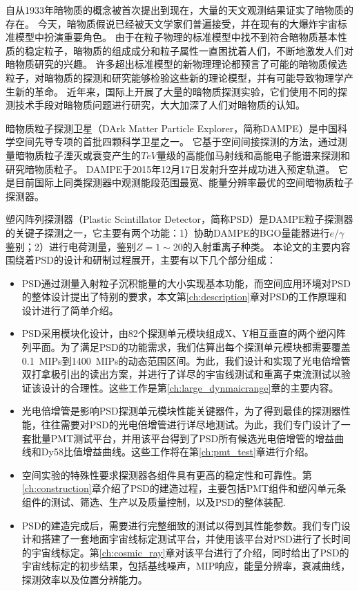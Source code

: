 
\begin{cabstract}
自从1933年暗物质的概念被首次提出到现在，大量的天文观测结果证实了暗物质的存在。
今天，暗物质假说已经被天文学家们普遍接受，并在现有的大爆炸宇宙标准模型中扮演重要角色。
由于在粒子物理的标准模型中找不到符合暗物质基本性质的稳定粒子，暗物质的组成成分和粒子属性一直困扰着人们，不断地激发人们对暗物质研究的兴趣。
许多超出标准模型的新物理理论都预言了可能的暗物质候选粒子，对暗物质的探测和研究能够检验这些新的理论模型，并有可能导致物理学产生新的革命。
近年来，国际上开展了大量的暗物质探测实验，它们使用不同的探测技术手段对暗物质问题进行研究，大大加深了人们对暗物质的认知。

暗物质粒子探测卫星（DArk Matter Particle Explorer，简称DAMPE）是中国科学空间先导专项的首批四颗科学卫星之一。
它基于空间间接探测的方法，通过测量暗物质粒子湮灭或衰变产生的$TeV$量级的高能伽马射线和高能电子能谱来探测和研究暗物质粒子。
DAMPE于2015年12月17日发射升空并成功进入预定轨道。
它是目前国际上同类探测器中观测能段范围最宽、能量分辨率最优的空间暗物质粒子探测器。

塑闪阵列探测器（Plastic Scintillator Detector，简称PSD）是DAMPE粒子探测器的关键子探测之一，它主要有两个功能：1）协助DAMPE的BGO量能器进行$e/\gamma$鉴别；2）进行电荷测量，鉴别$Z=1\sim 20$的入射重离子种类。
本论文的主要内容围绕着PSD的设计和研制过程展开，主要有以下几个部分组成：
\begin{itemize}
  \item PSD通过测量入射粒子沉积能量的大小实现基本功能，而空间应用环境对PSD的整体设计提出了特别的要求，本文第\ref{ch:description}章对PSD的工作原理和设计进行了简单介绍。
  \item PSD采用模块化设计，由82个探测单元模块组成X、Y相互垂直的两个塑闪阵列平面。为了满足PSD的功能需求，我们估算出每个探测单元模块都需要覆盖\SI{0.1}{MIPs}到\SI{1400}{MIPs}的动态范围区间。为此，我们设计和实现了光电倍增管双打拿极引出的读出方案，并进行了详尽的宇宙线测试和重离子束流测试以验证该设计的合理性。这些工作是第\ref{ch:large_dynmaicrange}章的主要内容。
  \item 光电倍增管是影响PSD探测单元模块性能关键器件，为了得到最佳的探测器性能，往往需要对PSD的光电倍增管进行详尽地测试。为此，我们专门设计了一套批量PMT测试平台，并用该平台得到了PSD所有候选光电倍增管的增益曲线和Dy58比值增益曲线。这些工作将在第\ref{ch:pmt_test}章进行介绍。
  \item 空间实验的特殊性要求探测器各组件具有更高的稳定性和可靠性。第\ref{ch:construction}章介绍了PSD的建造过程，主要包括PMT组件和塑闪单元条组件的测试、筛选、生产以及质量控制，以及PSD的整体装配.
  \item PSD的建造完成后，需要进行完整细致的测试以得到其性能参数。我们专门设计和搭建了一套地面宇宙线标定测试平台，并使用该平台对PSD进行了长时间的宇宙线标定。第\ref{ch:cosmic_ray}章对该平台进行了介绍，同时给出了PSD的宇宙线标定的初步结果，包括基线噪声，MIP响应，能量分辨率，衰减曲线，探测效率以及位置分辨能力。
\end{itemize}


\end{cabstract}

